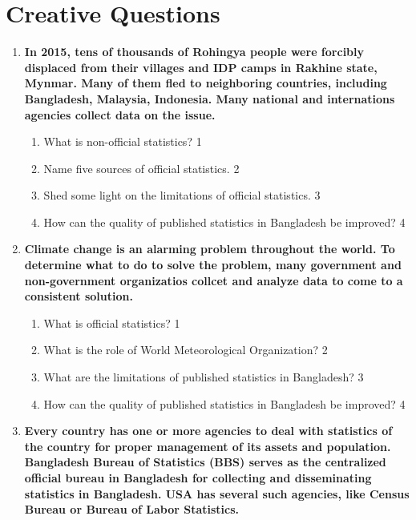 \documentclass[a4paper,oneside]{book}
\begin{document}
\section{Creative Questions}

  \begin{enumerate}
 \item
	  \textbf{In 2015, tens of thousands of Rohingya people were forcibly displaced from their villages and IDP camps in Rakhine state, Mynmar. Many of them fled to neighboring countries, including Bangladesh, Malaysia, Indonesia. Many national and internations agencies collect data on the issue.} 
  
  \begin{enumerate}
    \item
	What is non-official statistics? \hfill 1
    \item
	Name five sources of official statistics. \hfill 2
    \item  
	Shed some light on the limitations of official statistics. \hfill 3
    \item
	How can the quality of published statistics in Bangladesh be improved? \hfill 4
  \end{enumerate}
  
   \item
	  \textbf{Climate change is an alarming problem throughout the world. To determine what to do to solve the problem, many government and non-government organizatios collcet and analyze data  to come to a consistent solution.} 
  
  \begin{enumerate}
    \item
	What is official statistics?  \hfill 1
    \item
	What is the role of World Meteorological Organization? \hfill 2
    \item  
	What are the limitations of published statistics in Bangladesh? \hfill 3
    \item
	How can the quality of published statistics in Bangladesh be improved? \hfill 4
  \end{enumerate}


   \item
	  \textbf{Every country has one or more agencies to deal with statistics of 
	  the country for proper management of its assets and population. Bangladesh
	  Bureau of Statistics (BBS) serves as the centralized official bureau in 
	  Bangladesh for collecting and disseminating statistics in Bangladesh. 
	  USA has several such agencies, like Census Bureau or Bureau of Labor 
	  Statistics.} 
  

\end{enumerate}
\end{document}
